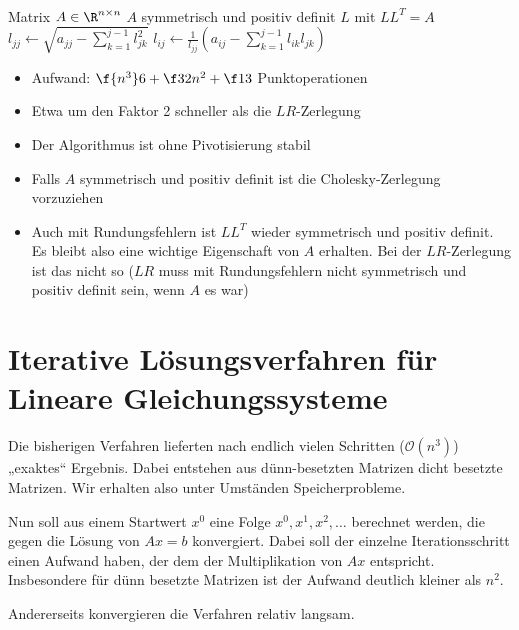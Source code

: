 \documentclass[a4paper]{scrartcl}
\numberwithin{equation}{section}
\begin{document}
\begin{alg}~
	\label{alg:3.15}
	\begin{algorithmic}
		\Input Matrix $A\in \R^{n\times n}$
		\Assume $A$ symmetrisch und positiv definit
		\Output $L$ mit $LL^T = A$
		\Statex
			\State $\displaystyle l_{jj} \gets \sqrt{a_{jj} - \sum_{k=1}^{j-1}l_{jk}^2}$
				\State $\displaystyle l_{ij} \gets \frac 1{l_{jj}} \left(a_{ij}-\sum_{k=1}^{j-1} l_{ik}l_{jk}\right)$
			\EndFor
		\EndFor
	\end{algorithmic}
	\begin{itemize}
		\item Aufwand: $\f {n^3}6 +\f32 n^2 +\f 13$ Punktoperationen
		\item Etwa um den Faktor 2 schneller als die $LR$-Zerlegung
		\item Der Algorithmus ist ohne Pivotisierung stabil
		\item Falls $A$ symmetrisch und positiv definit ist die Cholesky-Zerlegung vorzuziehen
		\item Auch mit Rundungsfehlern ist $LL^T$ wieder symmetrisch und positiv definit.
			Es bleibt also eine wichtige Eigenschaft von $A$ erhalten.
			Bei der $LR$-Zerlegung ist das nicht so ($LR$ muss mit Rundungsfehlern nicht symmetrisch und positiv definit sein, wenn $A$ es war)
	\end{itemize}
\end{alg}


\section{Iterative Lösungsverfahren für Lineare Gleichungssysteme}


Die bisherigen Verfahren lieferten nach endlich vielen Schritten ($\mathcal O(n^3)$) „exaktes“ Ergebnis.
Dabei entstehen aus dünn-besetzten Matrizen dicht besetzte Matrizen.
Wir erhalten also unter Umständen Speicherprobleme.

Nun soll aus einem Startwert $x^0$ eine Folge $x^0, x^1, x^2, \dotsc$ berechnet werden, die gegen die Lösung von $Ax=b$ konvergiert.
Dabei soll der einzelne Iterationsschritt einen Aufwand haben, der dem der Multiplikation von $Ax$ entspricht. 
Insbesondere für dünn besetzte Matrizen ist der Aufwand deutlich kleiner als $n^2$.

Andererseits konvergieren die Verfahren relativ langsam.
\end{document}
